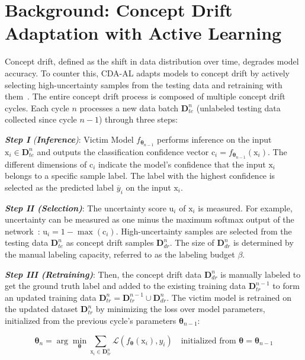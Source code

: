 
\section{Background: Concept Drift Adaptation with Active Learning}
\label{Sec: Concept Drift Adaptation}
Concept drift, defined as the shift in data distribution over time, degrades model accuracy.
To counter this, CDA-AL adapts models to concept drift by actively selecting high-uncertainty samples from the testing data and retraining with them~\cite{2023-Usenix-chenyizhen,park2016active,vzliobaite2013active}.
The entire concept drift process is composed of multiple concept drift cycles.
Each cycle $n$ processes a new data batch $\bm{D}_{te}^{n}$ (unlabeled testing data collected since cycle $n-1$) through three steps:

\emph{\textbf{Step I} (\textbf{Inference})}: Victim Model $f_{\bm{\theta}_{n-1}}$ performs inference on the input $\bm{\mathrm{x}}_{i} \in \bm{D}_{te}^{n}$ and outputs the classification confidence vector $\bm{\mathrm{c}}_{i} = f_{\bm{\theta}_{n-1}} \left( \bm{\mathrm{x}}_{i} \right)$.
	The different dimensions of $\bm{\mathrm{c}}_{i}$ indicate the model's confidence that the input $\bm{\mathrm{x}}_{i}$ belongs to a specific sample label.
	The label with the highest confidence is selected as the predicted label $\overline{y}_{i}$ on the input $\bm{\mathrm{x}}_{i}$.

\emph{\textbf{Step II (Selection)}}: The uncertainty score $\bm{\mathrm{u}}_{i}$ of $\bm{\mathrm{x}}_{i}$ is measured.
	For example, uncertainty can be measured as one minus the maximum softmax output of the network~\cite{2023-Usenix-chenyizhen}:
$\bm{\mathrm{u}}_{i} = 1-\max(\bm{\mathrm{c}}_{i})$.
	High-uncertainty samples are selected from the testing data $\bm{D}_{te}^{n}$ as concept drift samples $\bm{D}_{dr}^{n}$.
	The size of $\bm{D}_{dr}^{n}$ is determined by the manual labeling capacity, referred to as the labeling budget $\beta$.
	
\emph{\textbf{Step III (Retraining)}}: 
	Then, the concept drift data $\bm{D}_{dr}^{n}$ is manually labeled to get the ground truth label and added to the existing training data $\bm{D}^{n-1}_{tr}$ to form an updated training data $\bm{D}^{n}_{tr} = \bm{D}_{tr}^{n-1} \cup \bm{D}_{dr}^{n}$.
	The victim model is retrained on the updated dataset $\bm{D}^{n}_{tr}$ by minimizing the loss over model parameters, initialized from the previous cycle's parameters $\bm{\theta}_{n-1}$:
	
	\begin{equation}
		\bm{\theta}_{n} = \arg\min_{\bm{\theta}} \sum_{\bm{\mathrm{x}}_{i} \in \bm{D}^{n}_{tr}} \mathcal{L} \left( f_{\bm{\theta}}(\bm{\mathrm{x}}_{i}), y_{i} \right) 
		\quad \text{initialized from } \bm{\theta} = \bm{\theta}_{n-1}
		\label{active learning loss}
	\end{equation}
